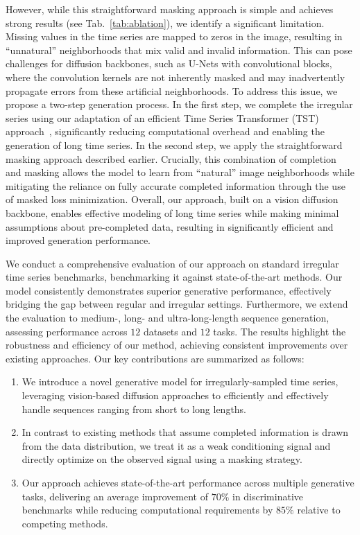 \documentclass{article}
\theoremstyle{plain}
\theoremstyle{definition}
\theoremstyle{remark}
\begin{document}
However, while this straightforward masking approach is simple and achieves strong results (see Tab.~\ref{tab:ablation}), we identify a significant limitation. Missing values in the time series are mapped to zeros in the image, resulting in ``unnatural'' neighborhoods that mix valid and invalid information. This can pose challenges for diffusion backbones, such as U-Nets with convolutional blocks, where the convolution kernels are not inherently masked and may inadvertently propagate errors from these artificial neighborhoods. To address this issue, we propose a two-step generation process. In the first step, we complete the irregular series using our adaptation of an efficient Time Series Transformer (TST) approach~\cite{zerveas2021transformer}, significantly reducing computational overhead and enabling the generation of long time series. In the second step, we apply the straightforward masking approach described earlier. Crucially, this combination of completion and masking allows the model to learn from ``natural'' image neighborhoods while mitigating the reliance on fully accurate completed information through the use of masked loss minimization. Overall, our approach, built on a vision diffusion backbone, enables effective modeling of long time series while making minimal assumptions about pre-completed data, resulting in significantly efficient and improved generation performance. 


We conduct a comprehensive evaluation of our approach on standard irregular time series benchmarks, benchmarking it against state-of-the-art methods. Our model consistently demonstrates superior generative performance, effectively bridging the gap between regular and irregular settings. Furthermore, we extend the evaluation to medium-, long- and ultra-long-length sequence generation, assessing performance across $12$ datasets and $12$ tasks. The results highlight the robustness and efficiency of our method, achieving consistent improvements over existing approaches. Our key contributions are summarized as follows:
\vspace{-1mm}
\begin{enumerate}
    \item We introduce a novel generative model for irregularly-sampled time series, leveraging vision-based diffusion approaches to efficiently and effectively handle sequences ranging from short to long lengths.
    \item In contrast to existing methods that assume completed information is drawn from the data distribution, we treat it as a weak conditioning signal and directly optimize on the observed signal using a masking strategy.
    \item Our approach achieves state-of-the-art performance across multiple generative tasks, delivering an average improvement of $70\%$ in discriminative benchmarks while reducing computational requirements by $85\%$ relative to competing methods.
\end{enumerate}
\end{document}

